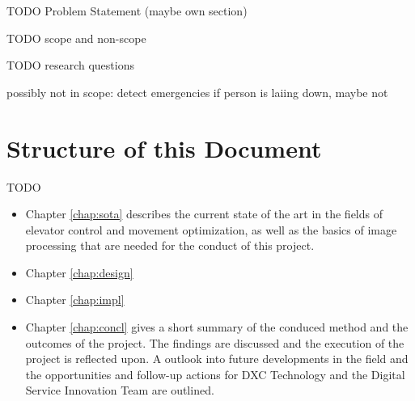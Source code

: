 TODO Problem Statement (maybe own section)

TODO scope and non-scope

TODO research questions

possibly not in scope: detect emergencies if person is laiing down, maybe not


\section{Structure of this Document}

TODO

\begin{itemize}
    \item Chapter \ref{chap:sota} describes the current state of the art in the fields of elevator control and movement optimization, as well as the basics of image processing that are needed for the conduct of this project.
    \item Chapter \ref{chap:design} 
    \item Chapter \ref{chap:impl}
    \item Chapter \ref{chap:concl} gives a short summary of the conduced method and the outcomes of the project. The findings are discussed and the execution of the project is reflected upon. A outlook into future developments in the field and the opportunities and follow-up actions for DXC Technology and the Digital Service Innovation Team are outlined.
\end{itemize}